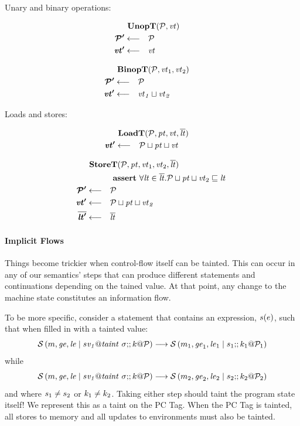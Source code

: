 \documentclass{article}
\begin{document}
Unary and binary operations:

\begin{minipage}[t]{.49\textwidth}            
  \[\begin{aligned}
  \truledef{\unopt{\PCT}{\vt}}
  \settag{\PCT'}{\PCT}
  \settag{\vt'}{\vt}
  \end{aligned}\]
\end{minipage}
\begin{minipage}[t]{.49\textwidth}           
  \[\begin{aligned}
  \truledef{\binopt{\PCT}{\vt_1}{\vt_2}}
  \settag{\PCT'}{\PCT}
  \settag{\vt'}{
    \vt_1 \sqcup \vt_2
  }
  \end{aligned}\]
\end{minipage}

Loads and stores:

\begin{minipage}[t]{.4\textwidth}     
\[\begin{aligned}
\truledef{\loadt{\PCT}{\pt}{\vt}{\overline{\lt}}}
\settag{\vt'}{\PCT \sqcup \pt \sqcup \vt}
\end{aligned}\]
\end{minipage}
\begin{minipage}[t]{.59\textwidth}
\[\begin{aligned}
\truledef{\storet{\PCT}{\pt}{\vt_1}{\vt_2}{\overline{\lt}}}
\assert{\forall \lt \in \overline{\lt} . \PCT \sqcup \pt \sqcup \vt_2 \sqsubseteq \lt}
\settag{\PCT'}{\PCT}
\settag{\vt'}{\PCT \sqcup \pt \sqcup \vt_2}
\settag{\overline{\lt'}}{\overline{\lt}}
\end{aligned}\]            
\end{minipage}

\paragraph{Implicit Flows}

Things become trickier when control-flow itself can be tainted. This can occur in
any of our semantics' steps that can produce different statements and continuations
depending on the tained value. At that point, any change to the machine state constitutes
an information flow.

To be more specific, consider a statement that contains an expression, \(s(e)\),
such that when filled in with a tainted value:
%
\[\mathcal{S}\left(m,\mathit{ge},\mathit{le} \mid s\mathit{v_1} @ \mathit{taint} ~ \sigma ;\!; k @ \mathcal{P}\right) \longrightarrow
\mathcal{S}\left(m_1,\mathit{ge}_1,\mathit{le}_1 \mid s_1 ;\!; k_1 @ \mathcal{P}_1\right)\]
%
while
%
\[\mathcal{S}\left(m,\mathit{ge},\mathit{le} \mid s\mathit{v_1} @ \mathit{taint} ~ \sigma ;\!; k @ \mathcal{P}\right) \longrightarrow
\mathcal{S}\left(m_2,\mathit{ge}_2,\mathit{le}_2 \mid s_2 ;\!; k_2 @ \mathcal{P}_2\right)\]
%
and where \(s_1 \not = s_2\) or \(k_1 \not = k_2\). Taking either step
should taint the program state itself! We represent this as a taint on the PC Tag.
When the PC Tag is tainted, all stores to memory and all updates to environments must
also be tainted.
\end{document}
